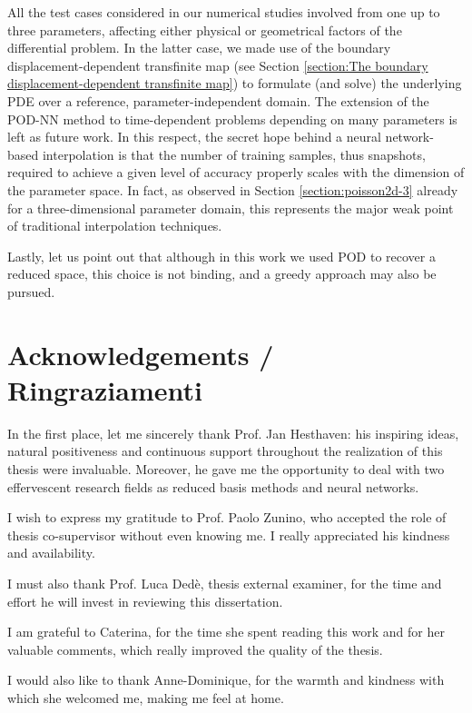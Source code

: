 \documentclass[12pt, a4paper, twoside, openright, notitlepage]{report}
\numberwithin{equation}{chapter}
\theoremstyle{theorem}
\theoremstyle{definition}
\theoremstyle{remark}
\theoremstyle{proposition}
\numberwithin{figure}{chapter}
\begin{document}
		All the test cases considered in our numerical studies involved from one up to three parameters, affecting either physical or geometrical factors of the differential problem. In the latter case, we made use of the boundary displacement-dependent transfinite map (see Section \ref{section:The boundary displacement-dependent transfinite map}) to formulate (and solve) the underlying PDE over a reference, parameter-independent domain. The extension of the POD-NN method to time-dependent problems depending on many parameters is left as future work. In this respect, the secret hope behind a neural network-based interpolation is that the number of training samples, thus snapshots, required to achieve a given level of accuracy properly scales with the dimension of the parameter space. In fact, as observed in Section \ref{section:poisson2d-3} already for a three-dimensional parameter domain, this represents the major weak point of traditional interpolation techniques.
		
		Lastly, let us point out that although in this work we used POD to recover a reduced space, this choice is not binding, and a greedy approach may also be pursued. 
		
		
	\chapter*{Acknowledgements / Ringraziamenti}
	
		In the first place, let me sincerely thank Prof. Jan Hesthaven: his inspiring ideas, natural positiveness and continuous support throughout the realization of this thesis were invaluable. Moreover, he gave me the opportunity to deal with two effervescent research fields as reduced basis methods and neural networks.
		
		I wish to express my gratitude to Prof. Paolo Zunino, who accepted the role of thesis co-supervisor without even knowing me. I really appreciated his kindness and availability.
		
		I must also thank Prof. Luca Dedè, thesis external examiner, for the time and effort he will invest in reviewing this dissertation.
		
		I am grateful to Caterina, for the time she spent reading this work and for her valuable comments, which really improved the quality of the thesis.
		
		I would also like to thank Anne-Dominique, for the warmth and kindness with which she welcomed me, making me feel at home.
		
\end{document}
